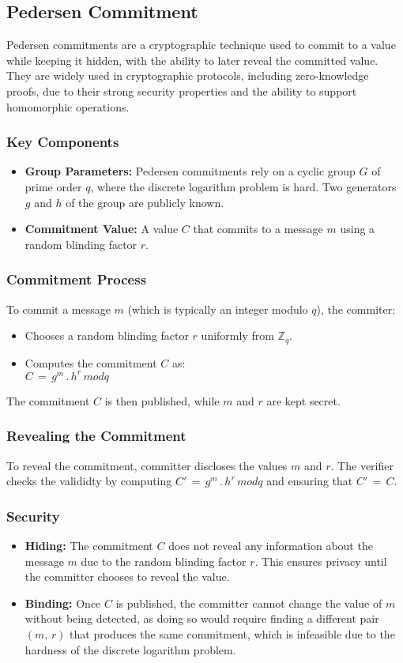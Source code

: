 \documentclass[12pt,a4paper]{report}
\begin{document}
\subsection{Pedersen Commitment}
Pedersen commitments are a cryptographic technique used to commit to a value 
while keeping it hidden, with the ability to later reveal the committed value. 
They are widely used in cryptographic protocols, including zero-knowledge proofs, 
due to their strong security properties and the ability to support homomorphic operations.
\subsubsection{Key Components}
\begin{itemize}
	\item \textbf{Group Parameters:} Pedersen commitments rely on a cyclic group $G$ of prime order $q$, where the discrete logarithm problem is hard. Two generators $g$ and $h$ of the group are publicly known.
	\item \textbf{Commitment Value:} A value $C$ that commits to a message $m$ using a random blinding factor $r$.
\end{itemize}
\subsubsection{Commitment Process}
To commit a message $m$ (which is typically an integer modulo $q$), the commiter:
\begin{itemize}
	\item Chooses a random blinding factor $r$ uniformly from $\mathbb{Z}_q$.
	\item Computes the commitment $C$ as:\\ $C\,=\,g^m\,.\,h^r\,modq$
\end{itemize}
The commitment $C$ is then published, while $m$ and $r$ are kept secret.
\subsubsection{Revealing the Commitment}
To reveal the commitment, committer discloses the values $m$ and $r$. The verifier checks the valididty by computing $C'\,=\,g^m\,.\,h^r\,modq$ and ensuring that $C'\,=\,C$.
\subsubsection{Security}
\begin{itemize}
	\item \textbf{Hiding:} The commitment $C$ does not reveal any information about the message $m$ due to the random blinding factor $r$. This ensures privacy until the committer chooses to reveal the value.
	\item \textbf{Binding:} Once $C$ is published, the committer cannot change the value of $m$ without being detected, as doing so would require finding a different pair $(m,\,r)$ that produces the same commitment, which is infeasible due to the hardness of the discrete logarithm problem.
\end{itemize}
\end{document}
